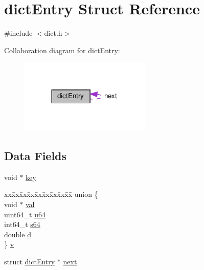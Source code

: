 \hypertarget{structdict_entry}{}\section{dict\+Entry Struct Reference}
\label{structdict_entry}


{\ttfamily \#include $<$dict.\+h$>$}



Collaboration diagram for dict\+Entry\+:
\nopagebreak
\begin{figure}[H]
\begin{center}
\leavevmode
\includegraphics[width=176pt]{structdict_entry__coll__graph}
\end{center}
\end{figure}
\subsection*{Data Fields}
\begin{DoxyCompactItemize}
\item 
void $\ast$ \hyperlink{structdict_entry_ab5c000aec752f2206131e183daf5efbf}{key}
\item 
\begin{tabbing}
xx\=xx\=xx\=xx\=xx\=xx\=xx\=xx\=xx\=\kill
union \{\\
\>void $\ast$ \hyperlink{structdict_entry_ab03f36f103bdec81305fd301f1f93885}{val}\\
\>uint64\_t \hyperlink{structdict_entry_a91ee3b6e2425e78feef03fb5c69d63e5}{u64}\\
\>int64\_t \hyperlink{structdict_entry_ae66ed2ec20c2115ff9970c73168fc0df}{s64}\\
\>double \hyperlink{structdict_entry_a873684cefeb665f3d5e6b495de57fc0d}{d}\\
\} \hyperlink{structdict_entry_a365d8ec140a4da1dd6163174c1476783}{v}\\

\end{tabbing}\item 
struct \hyperlink{structdict_entry}{dict\+Entry} $\ast$ \hyperlink{structdict_entry_ac1e00303554dcf7f08f4a1a4eb81f398}{next}
\end{DoxyCompactItemize}


